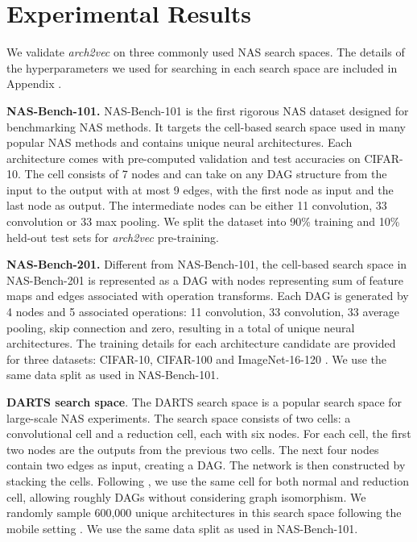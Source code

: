\section{Experimental Results}
\label{sec.experiments}

We validate \textit{arch2vec} on three commonly used NAS search spaces. The details of the hyperparameters we used for searching in each search space are included in Appendix .


\textbf{NAS-Bench-101.} NAS-Bench-101 \cite{pmlr-v97-ying19a} is the first rigorous NAS dataset designed for benchmarking NAS methods. It targets the cell-based search space used in many popular NAS methods \cite{zoph2018learning,liu2018progressive,liu2018darts} and contains  unique neural architectures. Each architecture comes with pre-computed validation and test accuracies on CIFAR-10. The cell consists of 7 nodes and can take on any DAG structure from the input to the output with at most 9 edges, with the first node as input and the last node as output. The intermediate nodes can be either 11 convolution, 33 convolution or 33 max pooling. We split the dataset into 90\% training and 10\% held-out test sets for \textit{arch2vec} pre-training.

\textbf{NAS-Bench-201.} Different from NAS-Bench-101, the cell-based search space in NAS-Bench-201 \cite{dong2020nasbench201} is represented as a DAG with nodes representing sum of feature maps and edges associated with operation transforms. Each DAG is generated by 4 nodes and 5 associated operations: 11 convolution, 33 convolution, 33 average pooling, skip connection and zero, resulting in a total of  unique neural architectures. The training details for each architecture candidate are provided for three datasets: CIFAR-10, CIFAR-100 and ImageNet-16-120 \cite{tinyimagenet17}. We use the same data split as used in NAS-Bench-101.

\textbf{DARTS search space}. The DARTS search space \cite{liu2018darts} is a popular search
space for large-scale NAS experiments. The search space consists of two cells: a convolutional cell and a reduction cell, each with six nodes. For each cell, the first two nodes are the outputs from the previous two cells. The next four nodes contain two edges as input, creating a DAG. The network is then constructed by stacking the cells. Following \cite{liu2018progressive}, we use the same cell for both normal and reduction cell, allowing roughly  DAGs without considering graph isomorphism. We randomly sample 600,000 unique architectures in this search space following the mobile setting \cite{liu2018darts}. We use the same data split as used in NAS-Bench-101. 


